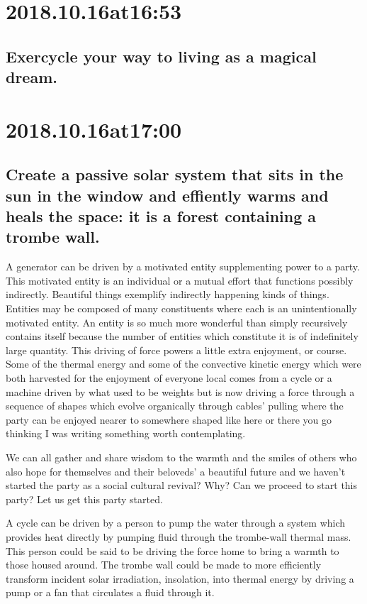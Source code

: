 \section*{ 2018.10.16at16:53 }
\subsection*{ Exercycle your way to living as a magical dream. }

\section*{ 2018.10.16at17:00 }
\subsection*{ Create a passive solar system that sits in the sun in the window and effiently warms and heals the space: it is a forest containing a trombe wall. }
A generator can be driven by a motivated entity supplementing power to a party.
This motivated entity is an individual or a mutual effort that functions possibly indirectly.
Beautiful things exemplify indirectly happening kinds of things.
Entities may be composed of many constituents where each is an unintentionally motivated entity.
An entity is so much more wonderful than simply recursively contains itself because the number of entities which constitute it is of indefinitely large quantity.
This driving of force powers a little extra enjoyment, or course.
Some of the thermal energy and some of the convective kinetic energy which were both harvested for the enjoyment of everyone local comes from a cycle or a machine driven by what used to be weights but is now driving a force through a sequence of shapes which evolve organically through cables' pulling where the party can be enjoyed nearer to somewhere shaped like here or there you go thinking I was writing something worth contemplating. 

We can all gather and share wisdom to the warmth and the smiles of others who also hope for themselves and their beloveds' a beautiful future and we haven't started the party as a social cultural revival?
Why?
Can we proceed to start this party?
Let us get this party started.

A cycle can be driven by a person to pump the water through a system which provides heat directly by pumping fluid through the trombe-wall thermal mass.
This person could be said to be driving the force home to bring a warmth to those housed around.
The trombe wall could be made to more efficiently transform incident solar irradiation, insolation, into thermal energy by driving a pump or a fan that circulates a fluid through it.

